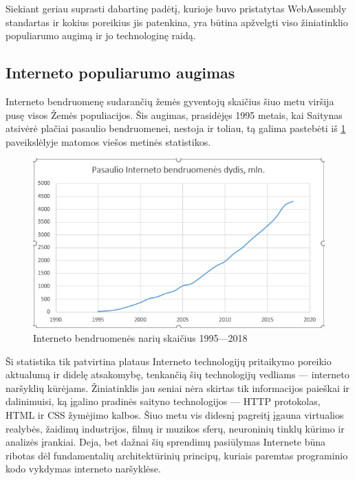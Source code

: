 \documentclass{VUMIFPSkursinis}
\begin{document}
Siekiant geriau suprasti dabartinę padėtį, kurioje buvo pristatytas WebAssembly standartas ir kokius poreikius jis patenkina, yra būtina apžvelgti viso žiniatinklio populiarumo augimą ir jo technologinę raidą.

\subsection{Interneto populiarumo augimas}

Interneto bendruomenę sudarančių žemės gyventojų skaičius šiuo metu viršija pusę visos Žemės populiacijos. Šis augimas, prasidėjęs 1995 metais, kai Saitynas atsivėrė plačiai pasaulio bendruomenei, nestoja ir toliau, tą galima pastebėti iš \ref{fig:internet_usage} paveikslėlyje matomos viešos metinės statistikos. 

\begin{figure}[h!]
  \includegraphics[scale=1]{interneto_naudojimo_statistika.png}
  \caption{Interneto bendruomenės narių skaičius 1995—2018}
  \label{fig:internet_usage}
\end{figure}

Ši statistika tik patvirtina plataus Interneto technologijų pritaikymo poreikio aktualumą ir didelę atsakomybę, tenkančią šių technologijų vedliams — interneto naršyklių kūrėjams. Žiniatinklis jau seniai nėra skirtas tik informacijos paieškai ir dalinimuisi, ką įgalino pradinės saityno technologijos — HTTP protokolas, HTML ir CSS žymėjimo kalbos. Šiuo metu vis didesnį pagreitį įgauna virtualios realybės, žaidimų industrijos, filmų ir muzikos sferų, neuroninių tinklų kūrimo ir analizės įrankiai. Deja, bet dažnai šių sprendimų pasiūlymas Internete būna ribotas dėl fundamentalių architektūrinių principų, kuriais paremtas programinio kodo vykdymas interneto naršyklėse.
\end{document}
